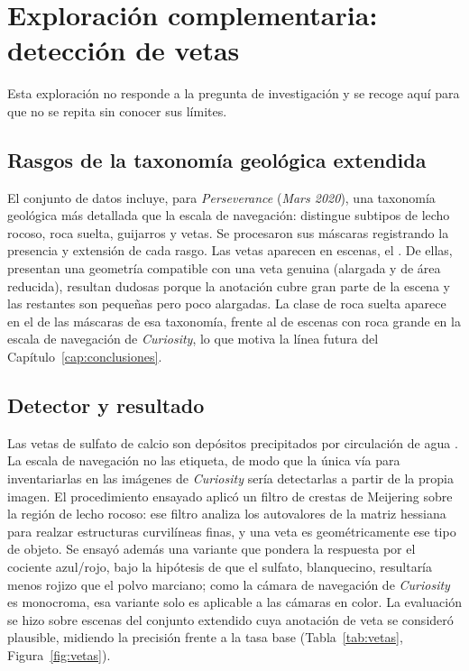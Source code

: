 \section{Exploración complementaria: detección de vetas}
\label{app:vetas}

Esta exploración no responde a la pregunta de investigación y se recoge aquí para que no se
repita sin conocer sus límites.

\subsection*{Rasgos de la taxonomía geológica extendida}

El conjunto de datos incluye, para \textit{Perseverance} (\textit{Mars 2020}), una taxonomía
geológica más detallada que la escala de navegación: distingue subtipos de lecho rocoso, roca
suelta, guijarros y vetas. Se procesaron sus \cGeoN{} máscaras registrando la presencia y
extensión de cada rasgo. Las vetas aparecen en \cGeoVeta{} escenas, el \cGeoVetaPct. De ellas,
\cGeoVetaProb{} presentan una geometría compatible con una veta genuina (alargada y de área
reducida), \cGeoVetaDud{} resultan dudosas porque la anotación cubre gran parte de la escena y
las \cGeoVetaResto{} restantes son pequeñas pero poco alargadas. La clase de roca suelta aparece
en el \cGeoFloatPct{} de las máscaras de esa taxonomía, frente al \cPctBigAny{} de escenas con
roca grande en la escala de navegación de \textit{Curiosity}, lo que motiva la línea futura del
Capítulo~\ref{cap:conclusiones}.

\subsection*{Detector y resultado}

Las vetas de sulfato de calcio son depósitos precipitados por circulación de agua
\citep{nachon2014sulfate}. La escala de
navegación no las etiqueta, de modo que la única vía para inventariarlas en las imágenes de
\textit{Curiosity} sería detectarlas a partir de la propia imagen. El procedimiento ensayado
aplicó un filtro de crestas de Meijering \citep{meijering2004neurite} sobre la región de lecho
rocoso: ese filtro analiza los autovalores de la matriz hessiana para realzar estructuras
curvilíneas finas, y una veta es geométricamente ese tipo de objeto. Se ensayó además una variante que pondera la respuesta por
el cociente azul/rojo, bajo la hipótesis de que el sulfato, blanquecino, resultaría menos
rojizo que el polvo marciano; como la cámara de navegación de \textit{Curiosity} es monocroma,
esa variante solo es aplicable a las cámaras en color. La evaluación se hizo sobre \cVetaN{} escenas del conjunto
extendido cuya anotación de veta se consideró plausible, midiendo la precisión frente a la tasa
base (Tabla~\ref{tab:vetas}, Figura~\ref{fig:vetas}).

